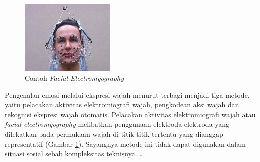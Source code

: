 \begin{figure}
    \centering
    \vspace{-12pt}
    \includegraphics[width=4.5cm]{gambar/27_active_motion_capture_sensors.jpg}
    \caption[Contoh \emph{Facial Electromyography}]{Contoh \emph{Facial Electromyography} \protect{}}
    \label{fig:contohfemg}
\end{figure}
Pengenalan emosi melalui ekspresi wajah menurut  terbagi menjadi tiga metode, yaitu pelacakan aktivitas elektromiografi wajah, pengkodean aksi wajah dan rekognisi ekspresi wajah otomatis. Pelacakan aktivitas elektromiografi wajah atau \emph{facial electromyography} melibatkan penggunaan elektroda-elektroda yang dilekatkan pada permukaan wajah di titik-titik tertentu yang dianggap representatif (Gambar \ref{fig:contohfemg}). Sayangnya metode ini tidak dapat digunakan dalam situasi sosial sebab kompleksitas teknisnya. \dots

